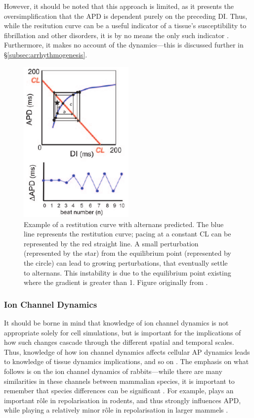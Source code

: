 \documentclass[../thesis-main.tex]{subfiles}
\begin{document}
However, it should be noted that this approach is limited, as it presents the oversimplification that the APD is dependent purely on the preceding DI. Thus, while the resitution curve can be a useful indicator of a tissue's susceptibility to fibrillation and other disorders, it is by no means the only such indicator \citep{Riccio1999}. Furthermore, it makes no account of the \cai{} dynamics---this is discussed further in \S\ref{subsec:arrhythmogenesis}.
\begin{figure}
 \centering
 \includegraphics[width=0.5\textwidth]{alternans-restitutionCurve}
 \caption[Example of a restitution curve with alternans predicted]{Example of a restitution curve with alternans predicted. The blue line represents the restitution curve; pacing at a constant CL can be represented by the red straight line. A small perturbation (represented by the star) from the equilibrium point (represented by the circle) can lead to growing perturbations, that eventually settle to alternans. This instability is due to the equilibrium point existing where the gradient is greater than 1. Figure originally from \citet{Weiss2006}.}
 \label{fig:alternans-restitutionCurve}
\end{figure}

\subsubsection{Ion Channel Dynamics}
\label{subsubsec:channel-dynamics}
It should be borne in mind that knowledge of ion channel dynamics is not appropriate solely for cell simulations, but is important for the implications of how such changes cascade through the different spatial and temporal scales. Thus, knowledge of how ion channel dynamics affects cellular AP dynamics leads to knowledge of tissue dynamics implications, and so on \citep{Spach1988}. The emphasis on what follows is on the ion channel dynamics of rabbits---while there are many similarities in these channels between mammalian species, it is important to remember that species differences can be significant \citep{Bassani1994}. For example, \ito{} plays an important r\^ole in repolarisation in rodents, and thus strongly influences APD, while playing a relatively minor r\^ole in repolarisation in larger mammels \citep{Rosati2004}.
\end{document}
